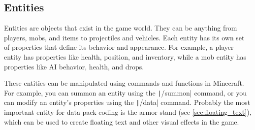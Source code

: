 \subsection{Entities}
\label{subsec:entities}

Entities are objects that exist in the game world. They can be anything from players, mobs, and items to projectiles and vehicles. Each entity has its own set of properties that define its behavior and appearance. For example, a player entity has properties like health, position, and inventory, while a mob entity has properties like AI behavior, health, and drops. 

These entities can be manipulated using commands and functions in Minecraft. For example, you can summon an entity using the \texttt|/summon| command, or you can modify an entity's properties using the \texttt|/data| command. Probably the most important entity for data pack coding is the armor stand (see \autoref{sec:floating_text}), which can be used to create floating text and other visual effects in the game.
